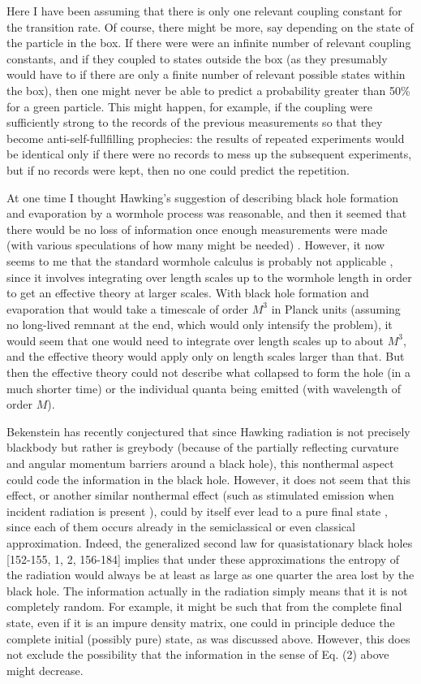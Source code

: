 \documentclass[12pt]{article}
\begin{document}
     Here I have been assuming that there is only one relevant
coupling
constant for the transition rate.  Of course, there might be more,
say
depending on the state of the particle in the box.  If there were
were an
infinite number of relevant coupling constants, and if they coupled
to states
outside the box (as they presumably would have to if there are only a
finite
number of relevant possible states within the box), then one might
never be
able to predict a probability greater than 50\% for a green particle.
This
might
happen, for example, if the coupling were sufficiently strong to the
records of
the previous measurements so that they become anti-self-fullfilling
prophecies:
 the results of repeated experiments would be identical only if there
were no
records to mess up the subsequent experiments, but if no records were
kept,
then no one could predict the repetition.

     At one time I thought Hawking's suggestion of describing black
hole
formation and evaporation by a wormhole process was reasonable, and
then it
seemed that there would be no loss of information once enough
measurements
were made (with various speculations of how many might be needed)
\cite{Pag92}.
 However, it now seems to me that the standard wormhole calculus is
probably
not applicable \cite{Pag93}, since it involves integrating over
length scales
up to the wormhole length in order to get an effective theory at
larger scales.
With black hole formation and evaporation that would take a timescale
of order $M^3$ in Planck units (assuming no long-lived remnant at the
end,
which would only intensify the problem), it
would seem that one would need to integrate over length scales up to
about
$M^3$, and the effective theory would apply only on length scales
larger than
that.  But then the effective theory could not describe what
collapsed to form
the hole (in a much shorter time) or the individual quanta being
emitted (with
wavelength of order $M$).

     Bekenstein has recently conjectured \cite{Bek93} that since
Hawking radiation is not precisely blackbody but rather is greybody
(because
of the partially reflecting curvature and angular momentum barriers
around
a black hole), this nonthermal aspect could code the
information in the black hole.  However, it does not seem that this
effect,
or another similar nonthermal effect (such as stimulated emission
when
incident radiation is present \cite{Schif93}),
could by itself ever lead to a pure final state \cite{DanSch,MulLou},
since each of them occurs already in the semiclassical
or even classical approximation.  Indeed, the
generalized second law for quasistationary black holes
[152-155, 1, 2, 156-184]
implies that under these approximations the entropy of the radiation
would
always be at least as large as one quarter the area lost by the black
hole.
The information actually in the radiation simply means that it is not
completely
random.  For example, it might be such that from the complete final
state,
even if it is an impure density matrix, one could in principle deduce
the
complete initial (possibly pure) state, as was discussed above.
However,
this does not exclude the possibility that the information in the
sense of Eq.
(2) above might decrease.
\end{document}
